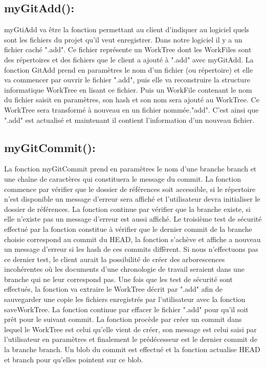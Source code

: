 \documentclass[11pt,francais]{article}
\begin{document}
\subsection{myGitAdd():}
	myGtiAdd va être la fonction permettant au client d'indiquer au logiciel quels sont les fichiers du projet qu'il veut enregistrer. Dans notre logiciel il y a un fichier caché ".add". Ce fichier représente un WorkTree dont les WorkFiles sont des répertoires et des fichiers que le client a ajouté à ".add" avec myGitAdd.
		La fonction GitAdd prend en paramètres le nom d'un fichier (ou répertoire)  et elle va commencer par ouvrir le fichier ".add", puis elle va reconstruire la structure informatique WorkTree en lisant ce fichier. Puis un WorkFile contenant le nom du fichier saisit en paramètres, son hash et son nom sera ajouté au WorkTree. Ce WorkTree sera transformé à nouveau en un fichier nommée."add". C'est ainsi que ".add" est actualisé et maintenant il contient l'information d'un nouveau fichier.
\subsection{myGitCommit():}
	La fonction myGitCommit prend en paramètres le nom d'une branche branch et une chaîne de caractères qui constituera le message du commit. La fonction commence par vérifier que le dossier de références soit accessible,  si le répertoire n'est disponible un message d'erreur sera affiché et l'utilisateur devra initialiser le dossier de références.  La fonction continue par vérifier que la branche existe, si elle n'existe pas un message d'erreur est aussi affiché.  Le troisième test de sécurité effectué par la fonction constitue à vérifier que le dernier commit de la branche choisie correspond au commit du HEAD, la fonction s'achève et affiche a nouveau un message d'erreur si les hash de ces commits diffèrent. Si nous n'effectuons pas ce dernier test, le client aurait la possibilité de créer des arborescences incohérentes où les documents d'une chronologie de travail seraient dans une branche qui ne leur correspond pas. 
	Une fois que les test de sécurité sont effectués, la fonction va extraire le WorkTree décrit par ".add" afin de sauvegarder une copie les fichiers enregistrés par l'utilisateur avec la fonction saveWorkTree.  La fonction continue par effacer le fichier ".add" pour qu'il soit prêt pour le suivant commit. La fonction procède par créer un commit dans lequel le WorkTree est celui qu'elle vient de créer, son message est celui saisi par l'utilisateur en paramètres et finalement le prédécesseur est le dernier commit de la branche branch.  Un blob du commit est effectué et la fonction actualise HEAD et branch pour qu'elles pointent sur ce blob.
\end{document}

